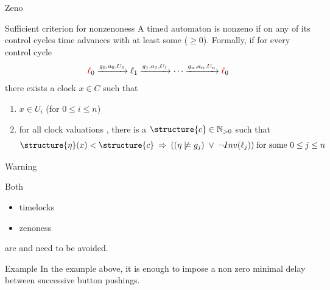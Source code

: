 \documentclass[aspectratio=169]{beamer}
\begin{document}
\begin{slide}{Zeno}
\small


\begin{block}{Sufficient criterion for nonzenoness}
A timed automaton is nonzeno if on any of its control cycles time advances with at least some  
 ($\geq 0$). Formally, if for every control cycle
\begin{equation*}
{\red \ell_0} \trans{g_0, a_0, U_0} \ell_1 \trans{g_1, a_1, U_1} \cdots  \trans{g_n, a_n, U_n} {\red \ell_0} 
\end{equation*}
there exists a clock $x \in C$ such that
\begin{enumerate}
\item  $x \in U_i$ (for $0 \leq i \leq n$)
\item for all clock valuations \structure{$\eta$}, there is a  $\structure{c} \in \N_{>0}$ such that
\begin{equation*}
\structure{\eta}(x) < \structure{c}\; \imp\; ((\eta \not\models g_j)\; \lor\; \lnot Inv(\ell_j)) \; \text{for some $0 \leq j \leq n$}
\end{equation*}
\end{enumerate}


\end{block}

\end{slide}


\begin{slide}{Warning}
\small

Both 
\begin{itemize}
\item timelocks
\item zenoness
\end{itemize}
are  and need to be avoided.


\begin{block}{Example}
In the example above, it is enough to impose a non zero minimal delay  between successive button pushings.
\end{block}

\end{slide}
\end{document}
